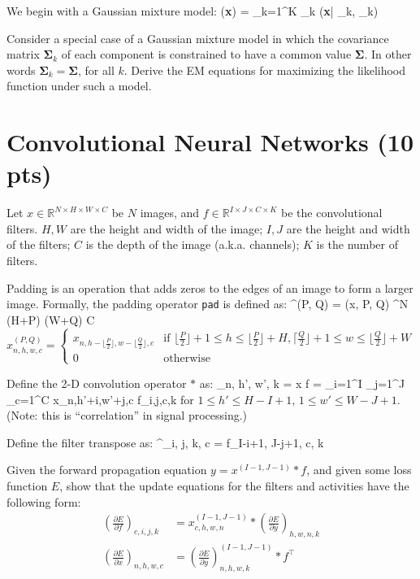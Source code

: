\documentclass[12pt]{article}
\def\beqa#1\eeqa{\begin{eqnarray}#1\end{eqnarray}}
\newcommand{\bmu}{{\boldsymbol{\mu}}}
\newcommand{\bSigma}{{\boldsymbol{\Sigma}}}
\newcommand{\bx}{{\bf{x}}}
\begin{document}
We begin with  a Gaussian mixture model:
\beqa
 p(\bx) = \sum_{k=1}^K \pi_k {}(\bx | \bmu_k, \bSigma_k)
\eeqa

Consider a special case of a Gaussian mixture model in which the covariance
matrix $\bSigma_k$ of each component is constrained to have a common
value $\bSigma$.  In other words $\bSigma_k = \bSigma$, for all $k$.  Derive
the EM equations for maximizing the likelihood function under such a model.

\section{Convolutional Neural Networks (10 pts)}
Let $x \in \mathbb{R}^{N \times H \times W \times C}$ be $N$ images, and 
$f \in \mathbb{R}^{I \times J \times C \times K}$ be the convolutional 
filters.
$H, W$ are the height and width of the image; 
$I, J$ are the height and width of the filters;
$C$ is the depth of the image (a.k.a. channels); 
$K$ is the number of filters.

Padding is an operation that adds zeros to the edges of an image to form a 
larger image. Formally, the padding operator {\tt pad} is defined as:
\beqa
x^{(P, Q)} = (x, P, Q) 
\in {}^{N \times (H+P) \times (W+Q) \times C}
\eeqa
\begin{equation}
x_{n, h, w, c}^{(P, Q)} = \begin{cases}
x_{n, h- \lfloor \frac{P}{2} \rfloor, w - \lfloor \frac{Q}{2} \rfloor, c} & 
\text{if } \lfloor \frac{P}{2} \rfloor + 1 \le h \le \lfloor \frac{P}{2}\rfloor+H, 
\lceil \frac{Q}{2} \rfloor + 1 \le w \le \lfloor \frac{Q}{2}\rfloor+W\\
0 &\text{otherwise}
\end{cases}
\end{equation}

Define the 2-D convolution operator $\ast$ as:
\beqa
y_{n, h', w', k} = x \ast f = 
\sum_{i=1}^{I} 
\sum_{j=1}^{J} 
\sum_{c=1}^C x_{n,h'+i,w'+j,c} \cdot f_{i,j,c,k}
\eeqa
for $1 \le h' \le H-I+1$, $1 \le w' \le W-J+1$. (Note: this is ``correlation''
in signal processing.)

Define the filter transpose as:
\beqa
f^\top_{i, j, k, c} = f_{I-i+1, J-j+1, c, k}
\eeqa

Given the forward propagation equation $y = x^{(I-1, J-1)} \ast f$,
and given some loss function $E$,
show that the update equations for the filters and activities have the 
following form:
\begin{align}
\left (\frac{\partial E}{\partial f} \right )_{c, i, j, k} &= 
x_{c, h, w, n}^{(I-1, J-1)}
\ast 
\left (\frac{\partial E}{\partial y} \right )_{h, w, n, k} \\
\left (\frac{\partial E}{\partial x} \right )_{n, h, w, c} &= 
\left (\frac{\partial E}{\partial y} \right )_{n, h, w, k} ^{(I-1, J-1)}
\ast f^\top
\end{align}
\end{document}
